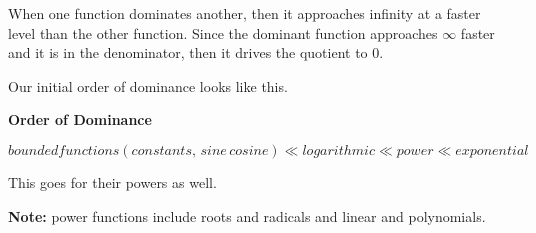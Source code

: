 \documentclass{ximera}
\begin{document}
When one function dominates another, then it approaches infinity at a faster level than the other function.  Since the dominant function approaches $\infty$ faster and it is in the denominator, then it drives the quotient to $0$.


Our initial order of dominance looks like this. \\


\begin{summary} \textbf{\textcolor{purple!85!blue}{Order of Dominance}}


\[   bounded functions (constants, \, sine \, cosine)  \ll logarithmic \ll power \ll  exponential  \]



This goes for their powers as well. 


\end{summary}

\textbf{Note:} power functions include roots and radicals and linear and polynomials.
\end{document}
